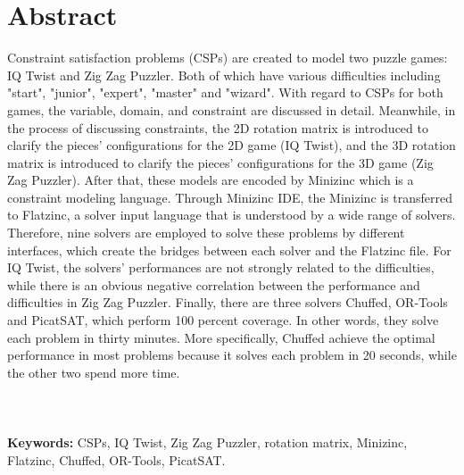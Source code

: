 \chapter*{Abstract}
\vspace{-1em}
Constraint satisfaction problems (CSPs) are created to model two puzzle games: IQ Twist and Zig Zag Puzzler. Both of which have various difficulties including "start", "junior", "expert", "master" and "wizard". With regard to CSPs for both games, the variable, domain, and constraint are discussed in detail. Meanwhile, in the process of discussing constraints, the 2D rotation matrix is introduced to clarify the pieces' configurations for the 2D game (IQ Twist), and the 3D rotation matrix is introduced to clarify the pieces' configurations for the 3D game (Zig Zag Puzzler). After that, these models are encoded by Minizinc which is a constraint modeling language. Through Minizinc IDE, the Minizinc is transferred to Flatzinc, a solver input language that is understood by a wide range of solvers. Therefore, nine solvers are employed to solve these problems by different interfaces, which create the bridges between each solver and the Flatzinc file. For IQ Twist, the solvers' performances are not strongly related to the difficulties, while there is an obvious negative correlation between the performance and difficulties in Zig Zag Puzzler. Finally, there are three solvers Chuffed, OR-Tools and PicatSAT, which perform 100 percent coverage. In other words,  they solve each problem in thirty minutes. More specifically, Chuffed achieve the optimal performance in most problems because it solves each problem in 20 seconds, while the other two spend more time.
\\
\\
\\
\\\textbf{Keywords:} CSPs, IQ Twist, Zig Zag Puzzler, rotation matrix, Minizinc, Flatzinc, Chuffed, OR-Tools, PicatSAT.


